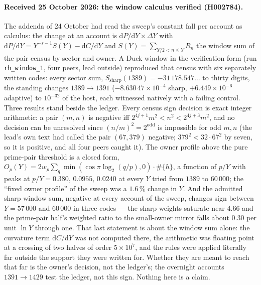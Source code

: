 \paragraph*{Received 25 October 2026: the window calculus verified (H002784).} The addenda of 24 October had read the sweep's constant fall per account as calculus: the change at an account is $\mathrm{d}P/\mathrm{d}Y\times\Delta Y$ with $\mathrm{d}P/\mathrm{d}Y = Y^{-s-1}S(Y)-\mathrm{d}C/\mathrm{d}Y$ and $S(Y)=\sum_{Y/2<n\le Y}R_n$ the window sum of the pair census by sector and owner. A Duck window in the verification form (run \texttt{rh\_window\_1}, four peers, lead outside) reproduced that census with six separately written codes: every sector sum, $S_{\mathrm{sharp}}(1389)=-31\,178.547\ldots$ to thirty digits, the standing changes $1389\to1391$ ($-8.630\,47\times10^{-4}$ sharp, $+6.449\times10^{-6}$ adaptive) to $10^{-32}$ of the host, each witnessed natively with a failing control. Three results stand beside the ledger. Every census sign decision is exact integer arithmetic: a pair $(m,n)$ is negative iff $2^{4j+1}m^2<n^2<2^{4j+3}m^2$, and no decision can be unresolved since $(n/m)^2=2^{\mathrm{odd}}$ is impossible for odd $m,n$ (the lead's own text had called the pair $(67,379)$ negative; $379^2<32\cdot67^2$ by seven, so it is positive, and all four peers caught it). The owner profile above the pure prime-pair threshold is a closed form, $O_p(Y)=2w_p\sum_q\min(\cos\pi\log_2(q/p),0)\cdot\#\{h\}$, a function of $p/Y$ with peaks at $p/Y=0.380,\,0.0955,\,0.0240$ at every $Y$ tried from $1389$ to $60\,000$; the ``fixed owner profile'' of the sweep was a $1.6\,\%$ change in $Y$. And the admitted sharp window sum, negative at every account of the sweep, changes sign between $Y=57\,000$ and $60\,000$ in three codes --- the sharp weights saturate near $4.66$ and the prime-pair half's weighted ratio to the small-owner mirror falls about $0.30$ per unit $\ln Y$ through one. That last statement is about the window sum alone: the curvature term $\mathrm{d}C/\mathrm{d}Y$ was not computed there, the arithmetic was floating point at a crossing of two halves of order $5\times10^{7}$, and the rules were applied literally far outside the support they were written for. Whether they are meant to reach that far is the owner's decision, not the ledger's; the overnight accounts $1391\to1429$ test the ledger, not this sign. Nothing here is a claim.

